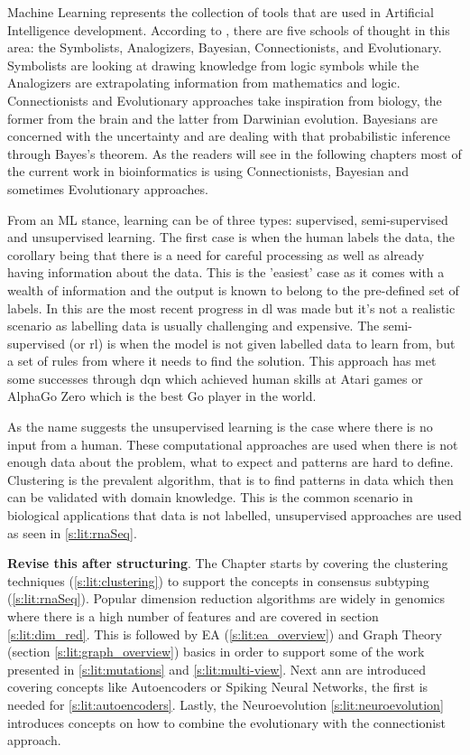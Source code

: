 Machine Learning represents the collection of tools that are used in Artificial Intelligence development. According to \citet{Domingos_Pedro2015-xr}, there are five schools of thought in this area: the Symbolists, Analogizers, Bayesian, Connectionists, and Evolutionary. Symbolists are looking at drawing knowledge from logic symbols while the Analogizers are extrapolating information from mathematics and logic\cite{Domingos_Pedro2015-xr}. Connectionists and Evolutionary approaches take inspiration from biology, the former from the brain and the latter from Darwinian evolution. Bayesians are concerned with the uncertainty and are dealing with that probabilistic inference through Bayes's theorem\cite{Domingos_Pedro2015-xr}. As the readers will see in the following chapters most of the current work in bioinformatics is using Connectionists, Bayesian and sometimes Evolutionary approaches.

From an ML stance, learning can be of three types: supervised, semi-supervised and unsupervised learning. The first case is when the human labels the data, the corollary being that there is a need for careful processing as well as already having information about the data. This is the 'easiest' case as it comes with a wealth of information and the output is known to belong to the pre-defined set of labels. In this are the most recent progress in \acrfull{dl} was made but it's not a realistic scenario as labelling data is usually challenging and expensive. The semi-supervised (or \acrfull{rl}) is when the model is not given labelled data to learn from, but a set of rules from where it needs to find the solution. This approach has met some successes through \acrfull{dqn} which achieved human skills at Atari games\cite{Mnih2015-cw} or AlphaGo Zero\cite{Silver2017-sw} which is the best Go player in the world. 

As the name suggests the unsupervised learning is the case where there is no input from a human. These computational approaches are used when there is not enough data about the problem, what to expect and patterns are hard to define. Clustering is the prevalent algorithm, that is to find patterns in data which then can be validated with domain knowledge. This is the common scenario in biological applications that data is not labelled, unsupervised approaches are used as seen in \cref{s:lit:rnaSeq}.


\textbf{Revise this after structuring}. The Chapter starts by covering the clustering techniques (\ref{s:lit:clustering}) to support the concepts in consensus subtyping (\ref{s:lit:rnaSeq}). Popular dimension reduction algorithms are widely in genomics where there is a high number of features and are covered in section \ref{s:lit:dim_red}. This is followed by EA (\cref{s:lit:ea_overview}) and Graph Theory (section \cref{s:lit:graph_overview}) basics in order to support some of the work presented in \cref{s:lit:mutations} and \ref{s:lit:multi-view}. Next \acrlong{ann} are introduced covering concepts like Autoencoders or Spiking Neural Networks, the first is needed for \cref{s:lit:autoencoders}. Lastly, the Neuroevolution \cref{s:lit:neuroevolution} introduces concepts on how to combine the evolutionary with the connectionist approach. 

